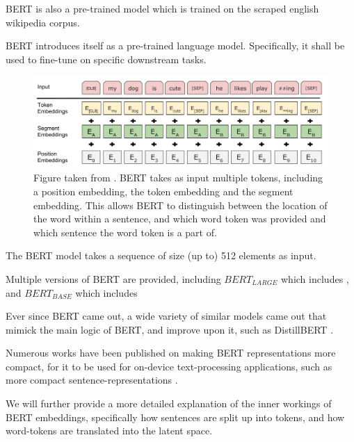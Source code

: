 \documentclass[a4paper,12pt,twoside,openright]{report}
\begin{document}

BERT is also a pre-trained model which is trained on the scraped english wikipedia corpus.

BERT introduces itself as a pre-trained language model.
Specifically, it shall be used to fine-tune on specific downstream tasks.



\begin{figure}[h]
	\center
  \includegraphics[width=\linewidth]{./assets/background/BERT_multiple_input_tokens.png}
  \caption{Figure taken from \cite{devlin18}. BERT takes as input multiple tokens, including a position embedding, the token embedding and the segment embedding. This allows BERT to distinguish between the location of the word within a sentence, and which word token was provided and which sentence the word token is a part of.}
  \label{fig:cbow_skipgram}
\end{figure}

The BERT model takes a sequence of size (up to) 512 elements as input.


Multiple versions of BERT are provided, including $BERT_{LARGE}$ which includes %
, and $BERT_{BASE}$ which includes %

Ever since BERT came out, a wide variety of similar models came out that mimick the main logic of BERT, and improve upon it, such as DistillBERT \cite{sanh19}.

Numerous works have been published on making BERT representations more compact, for it to be used for on-device text-processing applications, such as more compact sentence-representations \cite{shen19}.



We will further provide a more detailed explanation of the inner workings of BERT embeddings, specifically  how sentences are split up into tokens, and how word-tokens are translated into the latent space.
\end{document}

